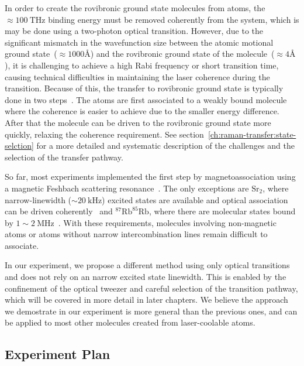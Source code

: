 In order to create the rovibronic ground state molecules from atoms,
the $\approx100~\mathrm{THz}$ binding energy must be removed coherently from the system,
which is may be done using a two-photon optical transition.
However, due to the significant mismatch in the wavefunction size
between the atomic motional ground state~($\approx1000\text{\AA}$)
and the rovibronic ground state of the molecule~($\approx4\text{\AA}$),
it is challenging to achieve a high Rabi frequency or short transition time,
causing technical difficulties in maintaining the laser coherence during the transition.
Because of this, the transfer to rovibronic ground state is typically done in two steps~\cite{
  danzl_quantum_2008,ni_high_2008,lang_ultracold_2008,takekoshi_ultracold_2014,
  molony_creation_2014,park_ultracold_2015,guo_creation_2016,
  kondov_molecular_2019,voges_ultracold_2020}.
The atoms are first associated to a weakly bound molecule
where the coherence is easier to achieve due to the smaller energy difference.
After that the molecule can be driven to the rovibronic ground state more quickly,
relaxing the coherence requirement. See section~\ref{ch:raman-transfer:state-selction}
for a more detailed and systematic description of the challenges
and the selection of the transfer pathway.

So far, most experiments implemented the first step
by magnetoassociation using a magnetic Feshbach scattering resonance~\cite{
  ni_high_2008,zhang_forming_2020}.
The only exceptions are $\mathrm{Sr}_2$,
where narrow-linewidth ($\sim 20~\mathrm{kHz}$) excited states
are available and optical association can be driven coherently~\cite{
  reinaudi_optical_2012,stellmer_creation_2012}
and $^{87}\mathrm{Rb}^{85}\mathrm{Rb}$,
where there are molecular states bound by $1\sim2~\mathrm{MHz}$~\cite{he_coherently_2020}.
With these requirements, molecules involving non-magnetic atoms
or atoms without narrow intercombination lines remain difficult to associate.

In our experiment, we propose a different method using only optical transitions
and does not rely on an narrow excited state linewidth.
This is enabled by the confinement of the optical tweezer and
careful selection of the transition pathway,
which will be covered in more detail in later chapters.
We believe the approach we demostrate in our experiment is more general
than the previous ones,
and can be applied to most other molecules created from laser-coolable atoms.

\subsection{Experiment Plan}
\label{ch:introduction:tweezers:plan}

